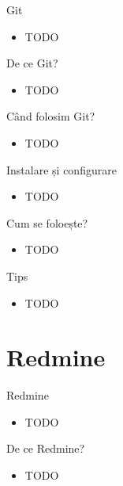 \documentclass{beamer}
\begin{document}
\begin{frame}{Git}
  \begin{itemize}
    \item TODO
  \end{itemize}
\end{frame}

\begin{frame}{De ce Git?}
  \begin{itemize}
    \item TODO
  \end{itemize}
\end{frame}

\begin{frame}{Când folosim Git?}
  \begin{itemize}
    \item TODO
  \end{itemize}
\end{frame}

\begin{frame}{Instalare și configurare}
  \begin{itemize}
    \item TODO
  \end{itemize}
\end{frame}

\begin{frame}{Cum se foloește?}
  \begin{itemize}
    \item TODO
  \end{itemize}
\end{frame}

\begin{frame}{Tips}
  \begin{itemize}
    \item TODO
  \end{itemize}
\end{frame}

\section{Redmine}

\begin{frame}{Redmine}
  \begin{itemize}
    \item TODO
  \end{itemize}
\end{frame}

\begin{frame}{De ce Redmine?}
  \begin{itemize}
    \item TODO
  \end{itemize}
\end{frame}
\end{document}
